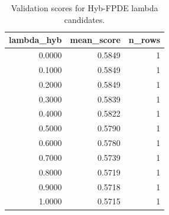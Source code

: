 \begin{table}[t]
\caption{Validation scores for Hyb-FPDE lambda candidates.}
\label{tab:lambda_distribution_computed}
\centering
\begin{tabular}{rrr}
\toprule
lambda\_hyb & mean\_score & n\_rows \\
\midrule
0.0000 & 0.5849 & 1 \\
0.1000 & 0.5849 & 1 \\
0.2000 & 0.5849 & 1 \\
0.3000 & 0.5839 & 1 \\
0.4000 & 0.5822 & 1 \\
0.5000 & 0.5790 & 1 \\
0.6000 & 0.5780 & 1 \\
0.7000 & 0.5739 & 1 \\
0.8000 & 0.5719 & 1 \\
0.9000 & 0.5718 & 1 \\
1.0000 & 0.5715 & 1 \\
\bottomrule
\end{tabular}

\end{table}
